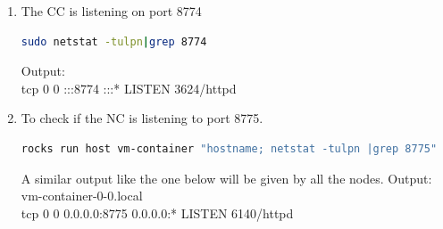 \begin{enumerate}
\item The CC is listening on port 8774
\begin{lstlisting}[language=bash]
sudo netstat -tulpn|grep 8774
\end{lstlisting}
Output:\\
tcp   \hspace{6mm}      0  \hspace{6mm}     0 :::8774       \hspace{6mm}               :::*                       \hspace{6mm}  LISTEN      3624/httpd 
\item To check if the NC is listening to port 8775.
\begin{lstlisting}[language=bash]
rocks run host vm-container "hostname; netstat -tulpn |grep 8775"
\end{lstlisting}
A similar output like the one below will be given by all the nodes.
Output:\\
vm-container-0-0.local \\
tcp   \hspace{6mm}     0   \hspace{6mm}   0 0.0.0.0:8775 \hspace{6mm}               0.0.0.0:*                  \hspace{6mm} LISTEN      6140/httpd 
\end{enumerate}
